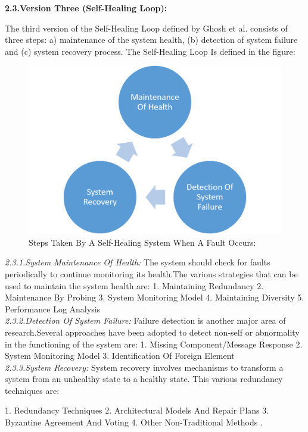 \textbf{2.3.Version Three (Self-Healing Loop):\\}

The third version of the Self-Healing Loop defined by Ghosh et al. consists of three steps:   a) maintenance of the system health, (b) detection of system failure and (c) system recovery process. The Self-Healing Loop Is defined in the figure:

\begin{figure}[H]
\includegraphics[width=5in]{img/SelfHealingStagesGhoshetal}
\caption{Steps Taken By A Self-Healing System When A Fault Occurs:}
\end{figure}

\textit{2.3.1.System Maintenance Of Health:}
The system should check for faults periodically to
continue monitoring its health.The various strategies that can be used to maintain the system health are:
1. Maintaining Redundancy
2. Maintenance By Probing
3. System Monitoring Model
4. Maintaining Diversity
5. Performance Log Analysis\\

\textit{2.3.2.Detection Of System Failure:}
Failure detection is another major area of research.Several approaches have been adopted
to detect non-self or abnormality in the functioning of the system are:
1. Missing Component/Message Response
2. System Monitoring Model
3. Identification Of Foreign Element\\

\textit{2.3.3.System Recovery:}
System recovery involves mechanisms to transform a system from an unhealthy state to a healthy state. 
This various redundancy techniques are:

1. Redundancy Techniques
2. Architectural Models And Repair Plans
3. Byzantine Agreement And Voting
4. Other Non-Traditional Methods
\cite{Ghosh:SelfHealingSurvey:2007}.\\
